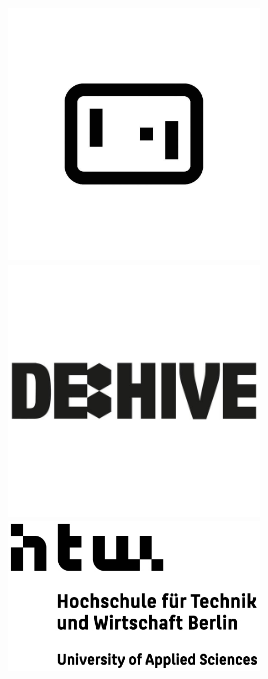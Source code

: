 \documentclass[a4paper, twoside, 10pt]{report}
\newcommand\blankpage{\null\thispagestyle{empty}\addtocounter{page}{-1}\newpage}
\begin{document}
\newpage
\pagestyle{empty}
\centering
\vfill
\includegraphics[width=0.5\textwidth]{Images/logo_GD_black.jpg}
\vfill
\vspace*{-2cm}
\includegraphics[width=0.5\textwidth]{Images/logo_dehive.jpg}
\vfill
\includegraphics[width=0.5\textwidth]{Images/logo_htw.jpg}
\vfill

\newpage
\blankpage

\newpage
\null
\pagecolor{black}
\end{document}
